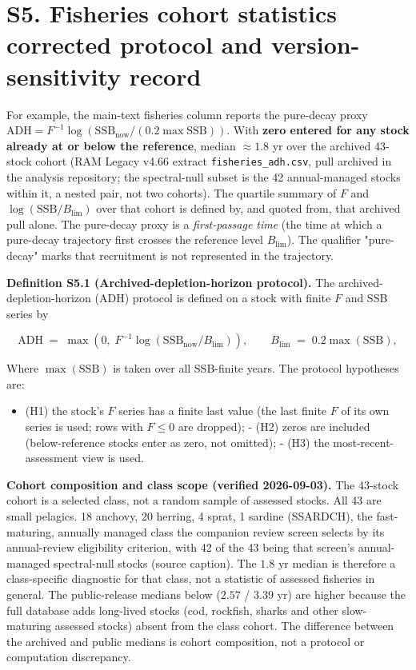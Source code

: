 \documentclass[11pt]{article}
\begin{document}
\vspace{0.8em}

\section*{S5. Fisheries cohort statistics  corrected protocol and version-sensitivity record}\label{s5-fisheries-cohort-statistics-corrected-protocol-and-version-sensitiv}

For example, the main-text fisheries column reports the pure-decay proxy \(\mathrm{ADH} = F^{-1}\log(\mathrm{SSB}_{\mathrm{now}}/(0.2\max\mathrm{SSB}))\). With \textbf{zero entered for any stock already at or below the reference}, median \(\approx 1.8\) yr over the archived 43-stock cohort (RAM Legacy v4.66 extract \texttt{fisheries\_ad\allowbreak{}h.\allowbreak{}csv}, pull archived in the analysis repository; the spectral-null subset is the 42 annual-managed stocks within it, a nested pair, not two cohorts). The quartile summary of \(F\) and \(\log(\mathrm{SSB}/B_{\lim})\) over that cohort is defined by, and quoted from, that archived pull alone. The pure-decay proxy is a \emph{first-passage time} (the time at which a pure-decay trajectory first crosses the reference level \(B_{\lim}\)). The qualifier "pure-decay" marks that recruitment is not represented in the trajectory.

\textbf{Definition S5.1 (Archived-depletion-horizon protocol).} The archived-depletion-horizon (ADH) protocol is defined on a stock with finite \(F\) and SSB series by

\[ \mathrm{ADH} \;=\; \max\!\left(0,\; F^{-1}\log\!\left(\mathrm{SSB}_{\mathrm{now}}/B_{\lim}\right)\right), \qquad B_{\lim} \;=\; 0.2\max(\mathrm{SSB}), \]

Where \(\max(\mathrm{SSB})\) is taken over all SSB-finite years. The protocol hypotheses are:

\begin{itemize}\setlength{\itemsep}{2pt}
\item (H1) the stock's \(F\) series has a finite last value (the last finite \(F\) of its own series is used; rows with \(F \le 0\) are dropped); - (H2) zeros are included (below-reference stocks enter as zero, not omitted); - (H3) the most-recent-assessment view is used.
\end{itemize}

\textbf{Cohort composition and class scope (verified 2026-09-03).} The 43-stock cohort is a selected class, not a random sample of assessed stocks. All 43 are small pelagics. 18 anchovy, 20 herring, 4 sprat, 1 sardine (SSARDCH), the fast-maturing, annually managed class the companion review screen selects by its annual-review eligibility criterion, with 42 of the 43 being that screen's annual-managed spectral-null stocks (source caption). The \(1.8\) yr median is therefore a class-specific diagnostic for that class, not a statistic of assessed fisheries in general. The public-release medians below (\(2.57\) / \(3.39\) yr) are higher because the full database adds long-lived stocks (cod, rockfish, sharks and other slow-maturing assessed stocks) absent from the class cohort. The difference between the archived and public medians is cohort composition, not a protocol or computation discrepancy.
\end{document}
